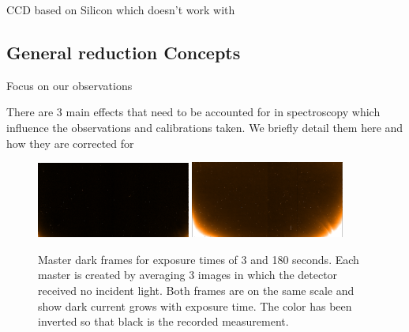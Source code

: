 CCD based on Silicon which doesn't work with \nir


\subsection{General reduction Concepts}
\label{subsec:nirreduction}

Focus on our observations

There are 3 main effects that need to be accounted for in \nir{} spectroscopy which influence the observations and calibrations taken. We briefly detail them here and how they are corrected for

\begin{figure}[h]
    \centering
    \includegraphics[width=0.45\textwidth]{figures/reduction/MasterDarkFlat_1.png}
    \includegraphics[width=0.45\textwidth]{figures/reduction/MasterDarkSpec_1.png}
    \caption{Master dark frames for exposure times of 3 and 180 seconds. Each master is created by averaging 3 images in which the detector received no incident light. Both frames are on the same scale and show dark current grows with exposure time. The color has been inverted so that black is the recorded measurement.}
    \label{fig:darkcurrent_colour}
\end{figure}

